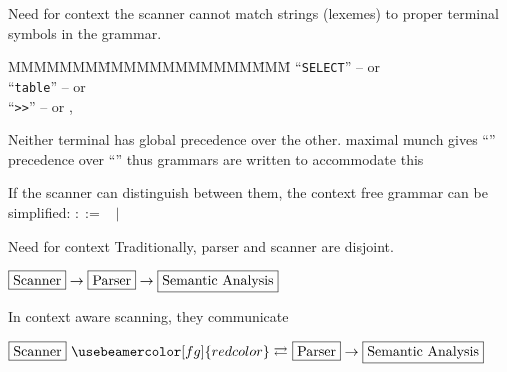\documentclass[notes,11pt,aspectratio=169]{beamer}
\newcommand{\ered}[1]{{\usebeamercolor[fg]{redcolor}#1}}
\begin{document}



\begin{frame}{Need for context}
\bis{0.25cm}
\x {} the scanner cannot match strings (lexemes) to
proper terminal symbols in the grammar.  

\begin{tabbing}
MMMMMMM\=MMMMMMMMMMMM\=MMM\=\kill
``\texttt{SELECT}'' \>--  \> or \>  \\
``\texttt{table}''  \>--   \> or \>  \\
``\texttt{>>}''     \>--    \> or \>   ,  
\end{tabbing}
\pause
\x Neither terminal has global precedence over the other. 
\bi \x maximal munch gives ``\code{>>}'' precedence over ``\code{>}''
    \x thus grammars are written to accommodate this
\ei

\x If the scanner can distinguish between them, the context free
   grammar can be simplified:
\bi 
 \x {} $::=$  \ $|$ \   \termlit{<}
     \termlit{>}
 \ei
\ei
\end{frame}


\begin{frame}{Need for context}
\bi
\x %
Traditionally, parser and scanner are disjoint.

\vskip 0.75cm

$\framebox{Scanner} \rightarrow \framebox{Parser}
\rightarrow \framebox{Semantic Analysis}$

\vskip 0.75cm

\x In context aware scanning, they communicate

\vskip 0.75cm

$\framebox{Scanner}\ \ered{\rightleftarrows}\ \framebox{Parser}
\rightarrow \framebox{Semantic Analysis}$

\ei
\end{frame}
\end{document}

